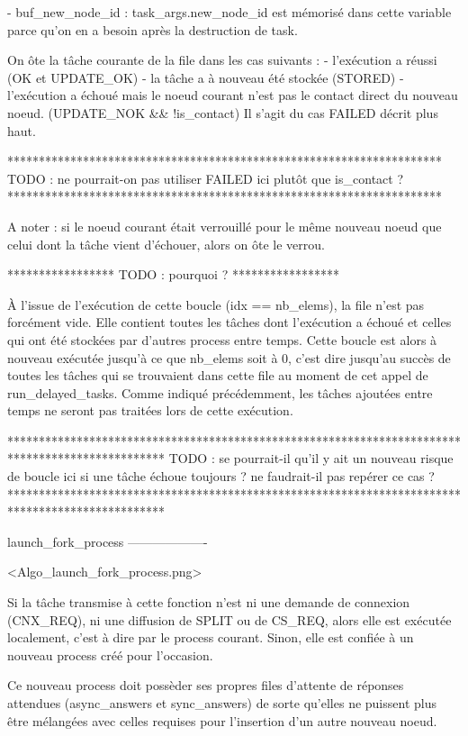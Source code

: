     - buf_new_node_id : task_args.new_node_id est mémorisé dans cette variable parce qu'on en a besoin
                        après la destruction de task.

    On ôte la tâche courante de la file dans les cas suivants :
        - l'exécution a réussi (OK et UPDATE_OK)
        - la tâche a à nouveau été stockée (STORED)
        - l'exécution a échoué mais le noeud courant n'est pas le contact direct du nouveau noeud.
          (UPDATE_NOK && !is_contact)
          Il s'agit du cas FAILED décrit plus haut.

*********************************************************************
TODO : ne pourrait-on pas utiliser FAILED ici plutôt que is_contact ?
*********************************************************************

A noter : si le noeud courant était verrouillé pour le même nouveau noeud que
celui dont la tâche vient d'échouer, alors on ôte le verrou.

*****************
TODO : pourquoi ?
*****************

À l'issue de l'exécution de cette boucle (idx == nb_elems), la file n'est pas forcément vide. Elle
contient toutes les tâches dont l'exécution a échoué et celles qui ont été stockées par d'autres
process entre temps. Cette boucle est alors à nouveau exécutée jusqu'à ce que nb_elems soit à 0,
c'est dire jusqu'au succès de toutes les tâches qui se trouvaient dans cette file au moment de
cet appel de run_delayed_tasks. Comme indiqué précédemment, les tâches ajoutées entre temps ne
seront pas traitées lors de cette exécution.

*************************************************************************************************
TODO : se pourrait-il qu'il y ait un nouveau risque de boucle ici si une tâche échoue toujours ?
       ne faudrait-il pas repérer ce cas ?
*************************************************************************************************


launch_fork_process
-------------------

<Algo_launch_fork_process.png>

Si la tâche transmise à cette fonction n'est ni une demande de connexion (CNX_REQ), ni une
diffusion de SPLIT ou de CS_REQ, alors elle est exécutée localement, c'est à dire par le process
courant. Sinon, elle est confiée à un nouveau process créé pour l'occasion.

Ce nouveau process doit possèder ses propres files d'attente de réponses attendues (async_answers et
sync_answers) de sorte qu'elles ne puissent plus être mélangées avec celles requises pour l'insertion
d'un autre nouveau noeud.

